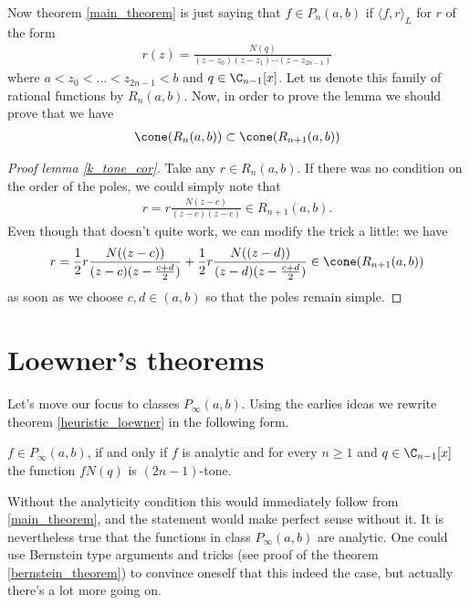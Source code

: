 Now theorem \ref{main_theorem} is just saying that $f \in P_{n}(a, b)$ if $\langle f, r \rangle_{L}$ for $r$ of the form
\begin{align*}
	r(z) = \frac{N(q)}{(z - z_{0}) (z - z_{1}) \cdots (z - z_{2 n - 1})}
\end{align*}
where $a < z_{0} < \ldots < z_{2 n - 1} < b$ and $q \in \C_{n - 1}[x]$. Let us denote this family of rational functions by $R_{n}(a, b)$. Now, in order to prove the lemma we should prove that we have
\begin{align*}
	\cone(R_{n}(a, b)) \subset \cone(R_{n + 1}(a, b))
\end{align*}

\begin{proof}[Proof lemma \ref{k_tone_cor}]
	Take any $r \in R_{n}(a, b)$. If there was no condition on the order of the poles, we could simply note that
	\begin{align*}
		r = r \frac{N(z - c)}{(z - c) (z - c)} \in R_{n + 1}(a, b).
	\end{align*}
	Even though that doesn't quite work, we can modify the trick a little: we have
	\begin{align*}
		r = \frac{1}{2} r \frac{N((z - c))}{(z - c) (z - \frac{c + d}{2})} +  \frac{1}{2} r\frac{N((z - d))}{(z - d) (z - \frac{c + d}{2})} \in \cone(R_{n + 1}(a, b))
	\end{align*}
	as soon as we choose $c, d \in (a, b)$ so that the poles remain simple.
\end{proof}

\section{Loewner's theorems}

Let's move our focus to classes $P_{\infty}(a, b)$. Using the earlies ideas we rewrite theorem \ref{heuristic_loewner} in the following form.

\begin{lause}\label{better_loewner}
	$f \in P_{\infty}(a, b)$, if and only if $f$ is analytic and for every $n \geq 1$ and $q \in \C_{n - 1}[x]$ the function $f N(q)$ is $(2 n - 1)$-tone.
\end{lause}

Without the analyticity condition this would immediately follow from \ref{main_theorem}, and the statement would make perfect sense without it. It is nevertheless true that the functions in class $P_{\infty}(a, b)$ are analytic. One could use Bernstein type arguments and tricks (see proof of the theorem \ref{bernstein_theorem}) to convince oneself that this indeed the case, but actually there's a lot more going on.

